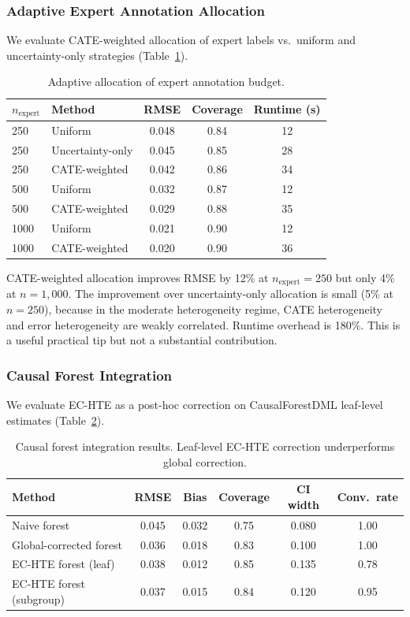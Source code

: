\documentclass[11pt,a4paper]{article}
\begin{document}
\subsubsection{Adaptive Expert Annotation Allocation}

We evaluate CATE-weighted allocation of expert labels vs.\ uniform and uncertainty-only strategies (Table~\ref{tab:adaptive}).

\begin{table}[t]
\centering
\caption{Adaptive allocation of expert annotation budget.}
\label{tab:adaptive}
\begin{tabular}{@{}llccc@{}}
\toprule
$n_{\text{expert}}$ & Method & RMSE & Coverage & Runtime (s) \\
\midrule
250  & Uniform         & 0.048 & 0.84 & 12 \\
250  & Uncertainty-only & 0.045 & 0.85 & 28 \\
250  & CATE-weighted    & 0.042 & 0.86 & 34 \\
500  & Uniform         & 0.032 & 0.87 & 12 \\
500  & CATE-weighted    & 0.029 & 0.88 & 35 \\
1000 & Uniform         & 0.021 & 0.90 & 12 \\
1000 & CATE-weighted    & 0.020 & 0.90 & 36 \\
\bottomrule
\end{tabular}
\end{table}

CATE-weighted allocation improves RMSE by 12\% at $n_{\text{expert}} = 250$ but only 4\% at $n = 1{,}000$. The improvement over uncertainty-only allocation is small (5\% at $n = 250$), because in the moderate heterogeneity regime, CATE heterogeneity and error heterogeneity are weakly correlated. Runtime overhead is 180\%. This is a useful practical tip but not a substantial contribution.

\subsubsection{Causal Forest Integration}

We evaluate EC-HTE as a post-hoc correction on CausalForestDML leaf-level estimates (Table~\ref{tab:forest}).

\begin{table}[t]
\centering
\caption{Causal forest integration results. Leaf-level EC-HTE correction underperforms global correction.}
\label{tab:forest}
\begin{tabular}{@{}lccccc@{}}
\toprule
Method & RMSE & Bias & Coverage & CI width & Conv.\ rate \\
\midrule
Naive forest              & 0.045 & 0.032 & 0.75 & 0.080 & 1.00 \\
Global-corrected forest   & 0.036 & 0.018 & 0.83 & 0.100 & 1.00 \\
EC-HTE forest (leaf)      & 0.038 & 0.012 & 0.85 & 0.135 & 0.78 \\
EC-HTE forest (subgroup)  & 0.037 & 0.015 & 0.84 & 0.120 & 0.95 \\
\bottomrule
\end{tabular}
\end{table}
\end{document}
